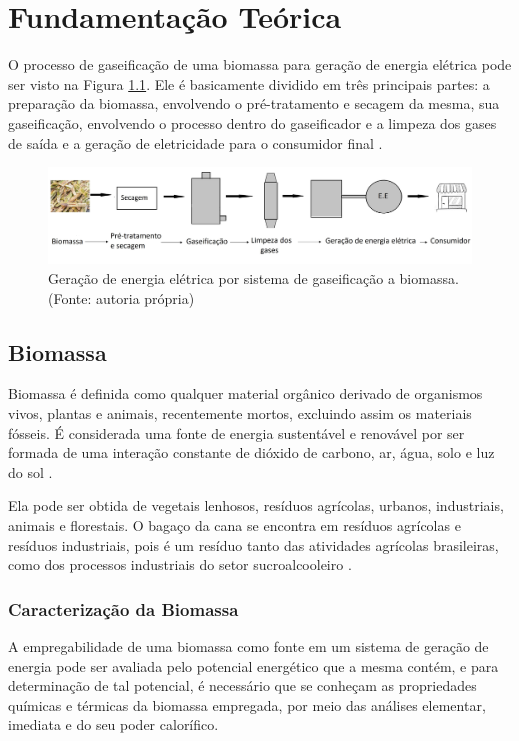 \chapter[Fundamentação Teórica]{Fundamentação Teórica}

O processo de gaseificação de uma biomassa para geração de energia elétrica pode ser visto na Figura \ref{fluxograma}. Ele é basicamente dividido em três principais partes: a preparação da biomassa, envolvendo o pré-tratamento e secagem da mesma, sua gaseificação, envolvendo o processo dentro do gaseificador e a limpeza dos gases de saída e a geração de eletricidade para o consumidor final \cite{chaves2016}.

\begin{figure}[!htb]
	\centering
	\includegraphics[width = 16cm]{Figuras/fluxograma_2}
	\caption{Geração de energia elétrica por sistema de gaseificação a biomassa. (Fonte: autoria própria)}
	\label{fluxograma}
\end{figure}


\section{Biomassa}

Biomassa é definida como qualquer material orgânico derivado de organismos vivos, plantas e animais, recentemente mortos, excluindo assim os materiais fósseis. É considerada uma fonte de energia sustentável e renovável por ser formada de uma interação constante de dióxido de carbono, ar, água, solo e luz do sol \cite{basu2010}.

Ela pode ser obtida de vegetais lenhosos, resíduos agrícolas, urbanos, industriais, animais e florestais. O bagaço da cana se encontra em resíduos agrícolas e resíduos industriais, pois é um resíduo tanto das atividades agrícolas brasileiras, como dos processos industriais do setor sucroalcooleiro \cite{biomassacortez}.
	
\subsection{Caracterização da Biomassa}

A empregabilidade de uma biomassa como fonte em um sistema de geração de energia pode ser avaliada pelo potencial energético que a mesma contém, e para determinação de tal potencial, é necessário que se conheçam as propriedades químicas e térmicas da biomassa empregada, por meio das análises elementar, imediata e do seu poder calorífico.

